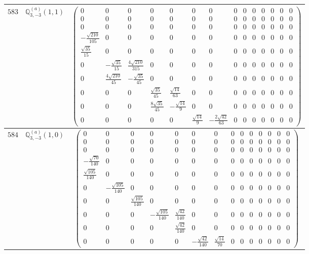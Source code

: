 \documentclass[fleqn,8pt,landscape]{jsarticle}
\begin{document}
\begin{center}
\begin{longtable}{ccc}
$ 583 $ & $ \mathbb{Q}_{3,-3}^{(a)}(1,1) $ & $ \begin{pmatrix} 0 & 0 & 0 & 0 & 0 & 0 & 0 & 0 & 0 & 0 & 0 & 0 & 0 & 0 \\ 0 & 0 & 0 & 0 & 0 & 0 & 0 & 0 & 0 & 0 & 0 & 0 & 0 & 0 \\ 0 & 0 & 0 & 0 & 0 & 0 & 0 & 0 & 0 & 0 & 0 & 0 & 0 & 0 \\ - \frac{\sqrt{210}}{105} & 0 & 0 & 0 & 0 & 0 & 0 & 0 & 0 & 0 & 0 & 0 & 0 & 0 \\ \frac{\sqrt{35}}{15} & 0 & 0 & 0 & 0 & 0 & 0 & 0 & 0 & 0 & 0 & 0 & 0 & 0 \\ 0 & - \frac{\sqrt{35}}{15} & \frac{4 \sqrt{210}}{315} & 0 & 0 & 0 & 0 & 0 & 0 & 0 & 0 & 0 & 0 & 0 \\ 0 & \frac{4 \sqrt{210}}{45} & - \frac{\sqrt{35}}{45} & 0 & 0 & 0 & 0 & 0 & 0 & 0 & 0 & 0 & 0 & 0 \\ 0 & 0 & 0 & \frac{\sqrt{35}}{45} & \frac{\sqrt{14}}{63} & 0 & 0 & 0 & 0 & 0 & 0 & 0 & 0 & 0 \\ 0 & 0 & 0 & \frac{8 \sqrt{35}}{45} & - \frac{\sqrt{14}}{9} & 0 & 0 & 0 & 0 & 0 & 0 & 0 & 0 & 0 \\ 0 & 0 & 0 & 0 & 0 & \frac{\sqrt{14}}{9} & - \frac{2 \sqrt{42}}{63} & 0 & 0 & 0 & 0 & 0 & 0 & 0 \end{pmatrix} $ \\ \hline
$ 584 $ & $ \mathbb{Q}_{3,-3}^{(a)}(1,0) $ & $ \begin{pmatrix} 0 & 0 & 0 & 0 & 0 & 0 & 0 & 0 & 0 & 0 & 0 & 0 & 0 & 0 \\ 0 & 0 & 0 & 0 & 0 & 0 & 0 & 0 & 0 & 0 & 0 & 0 & 0 & 0 \\ 0 & 0 & 0 & 0 & 0 & 0 & 0 & 0 & 0 & 0 & 0 & 0 & 0 & 0 \\ - \frac{\sqrt{70}}{140} & 0 & 0 & 0 & 0 & 0 & 0 & 0 & 0 & 0 & 0 & 0 & 0 & 0 \\ \frac{\sqrt{105}}{140} & 0 & 0 & 0 & 0 & 0 & 0 & 0 & 0 & 0 & 0 & 0 & 0 & 0 \\ 0 & - \frac{\sqrt{105}}{140} & 0 & 0 & 0 & 0 & 0 & 0 & 0 & 0 & 0 & 0 & 0 & 0 \\ 0 & 0 & \frac{\sqrt{105}}{140} & 0 & 0 & 0 & 0 & 0 & 0 & 0 & 0 & 0 & 0 & 0 \\ 0 & 0 & 0 & - \frac{\sqrt{105}}{140} & \frac{\sqrt{42}}{140} & 0 & 0 & 0 & 0 & 0 & 0 & 0 & 0 & 0 \\ 0 & 0 & 0 & 0 & \frac{\sqrt{42}}{140} & 0 & 0 & 0 & 0 & 0 & 0 & 0 & 0 & 0 \\ 0 & 0 & 0 & 0 & 0 & - \frac{\sqrt{42}}{140} & \frac{\sqrt{14}}{70} & 0 & 0 & 0 & 0 & 0 & 0 & 0 \end{pmatrix} $ \\ \hline

\end{longtable}
\end{center}
\end{document}
